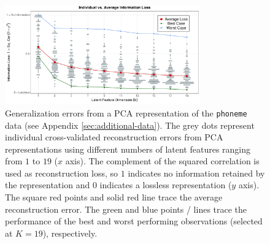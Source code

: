 \begin{figure}
    \centering
    \includegraphics[width=0.75\textwidth]{figures/info-loss.pdf}
    \caption{
    Generalization errors from a PCA representation of the \texttt{phoneme} data (see Appendix \ref{sec:additional-data}). The grey dots represent individual cross-validated reconstruction errors from PCA representations using different numbers of latent features ranging from $1$ to $19$ ($x$ axis).
    The complement of the squared correlation is used as reconstruction loss, so $1$ indicates no information retained by the representation and $0$ indicates a lossless representation ($y$ axis).
    The square red points and solid red line trace the average reconstruction error. The green and blue points / lines trace the performance of the best and worst performing observations (selected at $K=19$), respectively.
    }
    \label{fig:ind-losses}
\end{figure}


